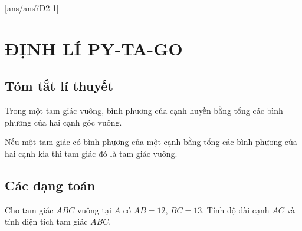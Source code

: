 [ans/ans7D2-1]
\section{ĐỊNH LÍ PY-TA-GO}
\subsection{Tóm tắt lí thuyết}
\begin{dl}[Py-ta-go]
Trong một tam giác vuông, bình phương của cạnh huyền bằng tổng các bình phương của hai cạnh góc vuông.
\end{dl}

\begin{dl}[Py-to-go đảo]
Nếu một tam giác có bình phương của một cạnh bằng tổng các bình phương của hai cạnh kia thì tam giác đó là tam giác vuông.
\end{dl}




\subsection{Các dạng toán}
\begin{dang}
\end{dang}

\begin{vd}
Cho tam giác $ABC$ vuông tại $A$ có $AB=12$, $BC=13$. Tính độ dài cạnh $AC$ và tính diện tích tam giác $ABC$.
\end{vd}

